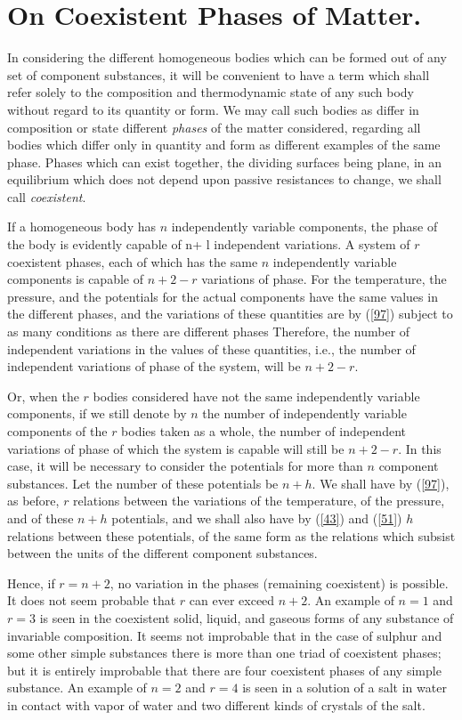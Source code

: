 \documentclass[12pt]{article}
\begin{document}
\section{On Coexistent Phases of Matter.}
In considering the different homogeneous bodies which can be formed out of any set of component substances, it will be convenient to have a term which shall refer solely to the composition and thermodynamic state of any such body without regard to its quantity or form. We may call such bodies as differ in composition or state different \textit{phases} of the matter considered, regarding all bodies which differ only in quantity and form as different examples of the same phase. Phases which can exist together, the dividing surfaces being plane, in an equilibrium which does not depend upon passive resistances to change, we shall call \textit{coexistent}.


If a homogeneous body has $n$ independently variable components, the phase of the body is evidently capable of n+ l independent variations. A system of $r$ coexistent phases, each of which has the same $n$ independently variable components is capable of $n+2-r$ variations of phase. For the temperature, the pressure, and the potentials for the actual components have the same values in the different phases, and the variations of these quantities are by (\ref{97}) subject to as many conditions as there are different phases Therefore, the number of independent variations in the values of these quantities, i.e., the number of independent variations of phase of the system, will be $n+2-r$.


Or, when the $r$ bodies considered have not the same independently variable components, if we still denote by $n$ the number of independently variable components of the $r$ bodies taken as a whole, the number of independent variations of phase of which the system is capable will still be $n+2-r$. In this case, it will be necessary to consider the potentials for more than $n$ component substances. Let the number of these potentials be $n+h$. We shall have by (\ref{97}), as before, $r$ relations between the variations of the temperature, of the pressure, and of these $n+h$ potentials, and we shall also have by (\ref{43}) and (\ref{51}) $h$ relations between these potentials, of the same form as the relations which subsist between the units of the different component substances.


Hence, if $r=n+2$, no variation in the phases (remaining coexistent) is possible. It does not seem probable that $r$ can ever exceed $n+ 2$. An example of $n=1$ and $r=3$ is seen in the coexistent solid, liquid, and gaseous forms of any substance of invariable composition. It seems not improbable that in the case of sulphur and some other simple substances there is more than one triad of coexistent phases; but it is entirely improbable that there are four coexistent phases of any simple substance. An example of $n=2$ and $r = 4$ is seen in a solution of a salt in water in contact with vapor of water and two different kinds of crystals of the salt.
\end{document}
